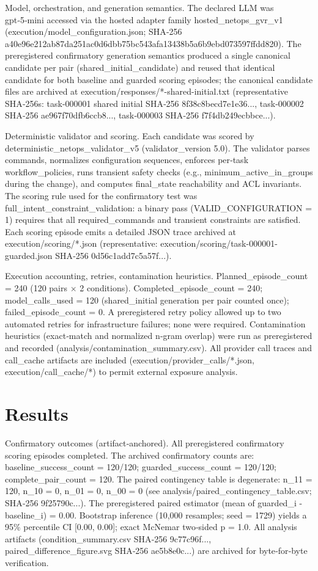 \documentclass[conference]{IEEEtran}
\begin{document}
Model, orchestration, and generation semantics. The declared LLM was gpt‑5‑mini accessed via the hosted adapter family hosted\_netops\_gvr\_v1 (execution/model\_configuration.json; SHA‑256 a40e96e212ab87da251ac0d6dbb75bc543afa13438b5a6b9ebd073597ffdd820). The preregistered confirmatory generation semantics produced a single canonical candidate per pair (shared\_initial\_candidate) and reused that identical candidate for both baseline and guarded scoring episodes; the canonical candidate files are archived at execution/responses/*-shared-initial.txt (representative SHA‑256s: task‑000001 shared initial SHA‑256 8f38c8becd7e1e36..., task‑000002 SHA‑256 ae967f70dfb6ccb8..., task‑000003 SHA‑256 f7f4db249ecbbce...).

Deterministic validator and scoring. Each candidate was scored by deterministic\_netops\_validator\_v5 (validator\_version 5.0). The validator parses commands, normalizes configuration sequences, enforces per‑task workflow\_policies, runs transient safety checks (e.g., minimum\_active\_in\_groups during the change), and computes final\_state reachability and ACL invariants. The scoring rule used for the confirmatory test was full\_intent\_constraint\_validation: a binary pass (VALID\_CONFIGURATION = 1) requires that all required\_commands and transient constraints are satisfied. Each scoring episode emits a detailed JSON trace archived at execution/scoring/*.json (representative: execution/scoring/task-000001-guarded.json SHA‑256 0d56c1add7c5a57f...).

Execution accounting, retries, contamination heuristics. Planned\_episode\_count = 240 (120 pairs \ensuremath{\times} 2 conditions). Completed\_episode\_count = 240; model\_calls\_used = 120 (shared\_initial generation per pair counted once); failed\_episode\_count = 0. A preregistered retry policy allowed up to two automated retries for infrastructure failures; none were required. Contamination heuristics (exact‑match and normalized n‑gram overlap) were run as preregistered and recorded (analysis/contamination\_summary.csv). All provider call traces and call\_cache artifacts are included (execution/provider\_calls/*.json, execution/call\_cache/*) to permit external exposure analysis.

\section{Results}
Confirmatory outcomes (artifact‑anchored). All preregistered confirmatory scoring episodes completed. The archived confirmatory counts are: baseline\_success\_count = 120/120; guarded\_success\_count = 120/120; complete\_pair\_count = 120. The paired contingency table is degenerate: n\_11 = 120, n\_10 = 0, n\_01 = 0, n\_00 = 0 (see analysis/paired\_contingency\_table.csv; SHA‑256 9f25790c...). The preregistered paired estimator (mean of guarded\_i - baseline\_i) = 0.00. Bootstrap inference (10,000 resamples; seed = 1729) yields a 95\% percentile CI [0.00, 0.00]; exact McNemar two‑sided p = 1.0. All analysis artifacts (condition\_summary.csv SHA‑256 9c77c96f..., paired\_difference\_figure.svg SHA‑256 ae5b8e0c...) are archived for byte‑for‑byte verification.
\end{document}
